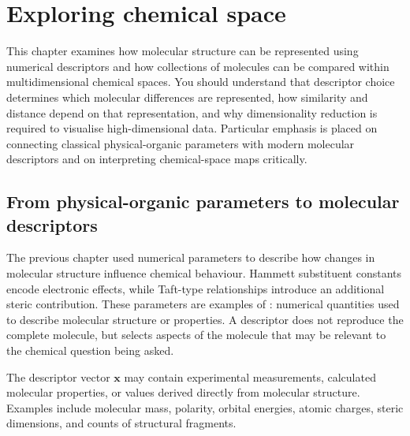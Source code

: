 
\chapter{Exploring chemical space}

\begin{notebox}
  This chapter examines how molecular structure can be represented using numerical descriptors and how collections of molecules can be compared within multidimensional chemical spaces.
  You should understand that descriptor choice determines which molecular differences are represented, how similarity and distance depend on that representation, and why dimensionality reduction is required to visualise high-dimensional data.
  Particular emphasis is placed on connecting classical physical-organic parameters with modern molecular descriptors and on interpreting chemical-space maps critically.
\end{notebox}

\section{From physical-organic parameters to molecular descriptors}

The previous chapter used numerical parameters to describe how changes in molecular structure influence chemical behaviour.
Hammett substituent constants encode electronic effects, while Taft-type relationships introduce an additional steric contribution.
These parameters are examples of : numerical quantities used to describe molecular structure or properties.
A descriptor does not reproduce the complete molecule, but selects aspects of the molecule that may be relevant to the chemical question being asked.


The descriptor vector $\mathbf{x}$ may contain experimental measurements, calculated molecular properties, or values derived directly from molecular structure.
Examples include molecular mass, polarity, orbital energies, atomic charges, steric dimensions, and counts of structural fragments.

